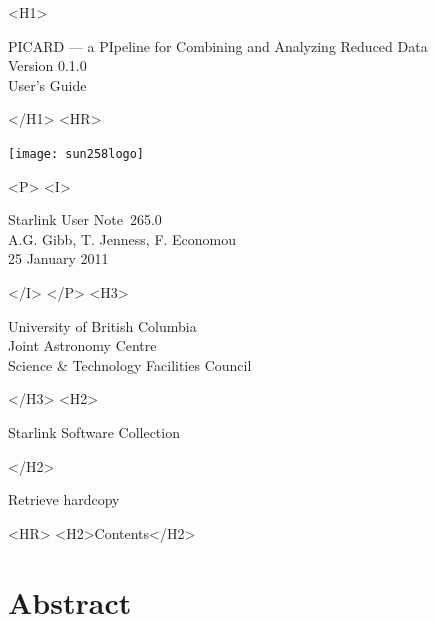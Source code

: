 \documentclass[twoside,11pt]{article}
\newcommand{\stardoccategory}  {Starlink User Note}
\newcommand{\stardocsource}    {sun\stardocnumber}
\newcommand{\stardocnumber}    {265.0}
\newcommand{\stardocauthors}   {A.G. Gibb, T. Jenness, F. Economou}
\newcommand{\stardocdate}      {25 January 2011}
\newcommand{\stardoctitle}     {PICARD --- a PIpeline for Combining and Analyzing Reduced Data}
\newcommand{\stardocversion}   {Version 0.1.0}
\newcommand{\stardocmanual}    {User's Guide}
\newcommand{\htmladdnormallink}[2]{#1}
\newcommand{\htmladdimg}[1]{}
\newcommand{\htmlref}[2]{#1}
\newcommand{\htmladdtonavigation}[1]{}
\newcommand{\xlabel}[1]{}
\renewcommand{\_}{\texttt{\symbol{95}}}
\begin{document}
\begin{htmlonly}
   \xlabel{}
   \begin{rawhtml} <H1> \end{rawhtml}
      \stardoctitle\\
      \stardocversion\\
      \stardocmanual
   \begin{rawhtml} </H1> <HR> \end{rawhtml}

\texttt{[image: sun258\_logo]}

   \begin{rawhtml} <P> <I> \end{rawhtml}
   \stardoccategory\ \stardocnumber \\
   \stardocauthors \\
   \stardocdate
   \begin{rawhtml} </I> </P> <H3> \end{rawhtml}
      \htmladdnormallink{University of British Columbia}
                        {http://www.ubc.ca} \\
      \htmladdnormallink{Joint Astronomy Centre}
                        {http://www.jach.hawaii.edu}\\
      \htmladdnormallink{Science \& Technology Facilities Council}
                        {http://www.stfc.ac.uk} \\
   \begin{rawhtml} </H3> <H2> \end{rawhtml}
      \htmladdnormallink{Starlink Software Collection}{http://starlink.jach.hawaii.edu/}
   \begin{rawhtml} </H2> \end{rawhtml}
   \htmladdnormallink{\htmladdimg{source.gif} Retrieve hardcopy}
      {http://starlink.jach.hawaii.edu/cgi-bin/hcserver?\stardocsource}\\

  \label{stardoccontents}
  \begin{rawhtml}
    <HR>
    <H2>Contents</H2>
  \end{rawhtml}
  \htmladdtonavigation{\htmlref{\htmladdimg{contents_motif.gif}}
        {stardoccontents}}

  \section{\xlabel{abstract}Abstract}
\end{htmlonly}
\end{document}
